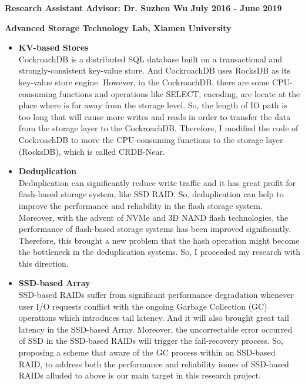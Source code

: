 \documentclass[letterpaper,onecolumn,10pt]{article}
\begin{document}
\raggedright
{\bf Research Assistant }
\hfill
{\bf Advisor: Dr. Suzhen Wu \hspace{0.3cm} July 2016 - June 2019}\\
\raggedright
{\bf Advanced Storage Technology Lab, Xiamen University}
\begin{itemize}
\item \textbf{KV-based Stores} \\
CockroachDB is a distributed SQL database built on a transactional and strongly-consistent key-value store. And CockroachDB uses RocksDB as its key-value store engine. However, in the CockroachDB,  there are some CPU-consuming functions and operations like SELECT, encoding, are locate at the place where is far away from the storage level. So, the length of IO path is too long that will cause more writes and reads in order to transfer the data from the storage layer to the CockroachDB. Therefore, I modified the code of CockroachDB to move the CPU-consuming functions to the storage layer (RocksDB), which is called CRDB-Near.
\end{itemize}
\begin{itemize}
\item \textbf{Deduplication} \\
Deduplication can significantly reduce write traffic and it has great profit for flash-based storage system, like SSD RAID. So, deduplication can help to improve the performance and reliability in the flash storage system. Moreover, with the advent of NVMe and 3D NAND flash technologies, the performance of flash-based storage systems has been improved significantly. Therefore, this brought a new problem that the hash operation might become the bottleneck in the deduplication systems. So, I proceeded my research with this direction.
\end{itemize}
\begin{itemize}
\item \textbf{SSD-based Array} \\
SSD-based RAIDs suffer from significant performance degradation whenever user I/O requests conflict with the ongoing Garbage Collection (GC) operations which introduces tail latency. And it will also brought great tail latency in the SSD-based Array. Moreover, the uncorrectable error occurred of SSD in the SSD-based RAIDs will trigger the fail-recovery process. So, proposing a scheme that aware of the GC process within an SSD-based RAID, to address both the performance and reliability issues of SSD-based RAIDs alluded to above is our main target in this research project.
\end{itemize}
\end{document}
